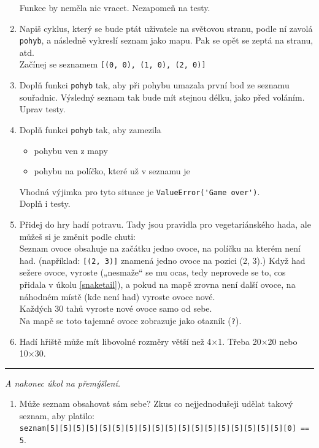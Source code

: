 \documentclass[a4paper,10pt]{article}
\newcommand\startsection[1]{
     \vspace{0.2ex}
    \hrule
    {\fontspec{Oxygen} \tiny
     \vspace{-1ex}
     \emph{#1}
     \vspace{-1.5em}
    }
}
\begin{document}
\begin{enumerate}[resume]
    Funkce by neměla nic vracet.
    Nezapomeň na testy.

\item Napiš cyklus, který se bude ptát uživatele na světovou stranu,
    podle ní zavolá \verb+pohyb+, a následně vykreslí seznam jako mapu.
    Pak se opět se zeptá na stranu, atd.
    \\Začínej se seznamem \verb+[(0, 0), (1, 0), (2, 0)]+

\item \label{snaketail}
    Doplň funkci \verb+pohyb+ tak, aby při pohybu umazala první bod ze seznamu
    souřadnic. Výsledný seznam tak bude mít stejnou délku, jako před voláním.
    \\Uprav testy.

\item Doplň funkci \verb+pohyb+ tak, aby zamezila
    \begin{itemize}
    \item pohybu ven z mapy
    \item pohybu na políčko, které už v seznamu je
    \end{itemize}
    Vhodná výjimka pro tyto situace je \verb+ValueError('Game over')+.
    \\Doplň i testy.

\item Přidej do hry hadí potravu. Tady jsou pravidla pro vegetariánského hada,
    ale můžeš si je změnit podle chuti:
    \\ Seznam ovoce obsahuje na začátku jedno ovoce, na políčku na kterém není had.
    (například: \texttt{[(2, 3)]} znamená jedno ovoce na pozici (2, 3).)
    Když had sežere ovoce, vyroste („nesmaže“ se mu ocas, tedy neprovede se to,
    cos přidala v úkolu \ref{snaketail}),
    a pokud na mapě zrovna není další ovoce, na náhodném místě (kde není had) vyroste ovoce nové.
    \\Každých 30 tahů vyroste nové ovoce samo od sebe.
    \\Na mapě se toto tajemné ovoce zobrazuje jako otazník (\verb+?+).

\item \label{snakeend}
    Hadí hřiště může mít libovolné rozměry větší než 4×1.
    Třeba 20×20 nebo 10×30.

\end{enumerate}

\startsection{A nakonec úkol na přemýšlení.}

\begin{enumerate}[resume]

\item Může seznam obsahovat sám sebe? Zkus co nejjednodušeji udělat takový seznam, aby platilo:
    \\\verb+seznam[5][5][5][5][5][5][5][5][5][5][5][5][5][5][5][5][5][5][0] == 5+.

\end{enumerate}
\end{document}
